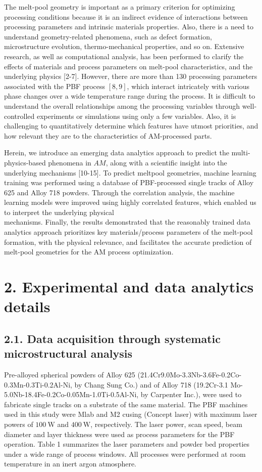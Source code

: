 \documentclass[10pt]{article}
\begin{document}
The melt-pool geometry is important as a primary criterion for optimizing processing conditions because it is an indirect evidence of interactions between processing parameters and intrinsic materials properties. Also, there is a need to understand geometry-related phenomena, such as defect formation, microstructure evolution, thermo-mechanical properties, and so on. Extensive research, as well as computational analysis, has been performed to clarify the effects of materials and process parameters on melt-pool characteristics, and the underlying physics [2-7]. However, there are more than 130 processing parameters associated with the PBF process $[8,9]$, which interact intricately with various phase changes over a wide temperature range during the process. It is difficult to understand the overall relationships among the processing variables through well-controlled experiments or simulations using only a few variables. Also, it is challenging to quantitatively determine which features have utmost priorities, and how relevant they are to the characteristics of AM-processed parts.

Herein, we introduce an emerging data analytics approach to predict the multi-physics-based phenomena in $A M$, along with a scientific insight into the underlying mechanisms [10-15]. To predict meltpool geometries, machine learning training was performed using a database of PBF-processed single tracks of Alloy 625 and Alloy 718 powders. Through the correlation analysis, the machine learning models were improved using highly correlated features, which enabled us to interpret the underlying physical\\
mechanisms. Finally, the results demonstrated that the reasonably trained data analytics approach prioritizes key materials/process parameters of the melt-pool formation, with the physical relevance, and facilitates the accurate prediction of melt-pool geometries for the AM process optimization.

\section*{2. Experimental and data analytics details}
\subsection*{2.1. Data acquisition through systematic microstructural analysis}
Pre-alloyed spherical powders of Alloy 625 (21.4Cr9.0Mo-3.3Nb-3.6Fe-0.2Co-0.3Mn-0.3Ti-0.2Al-Ni, by Chang Sung Co.) and of Alloy 718 (19.2Cr-3.1 Mo-5.0Nb-18.4Fe-0.2Co-0.05Mn-1.0Ti-0.5Al-Ni, by Carpenter Inc.), were used to fabricate single tracks on a substrate of the same material. The PBF machines used in this study were Mlab and M2 cusing (Concept laser) with maximum laser powers of $100 \mathrm{~W}$ and $400 \mathrm{~W}$, respectively. The laser power, scan speed, beam diameter and layer thickness were used as process parameters for the PBF operation. Table 1 summarizes the laser parameters and powder bed properties under a wide range of process windows. All processes were performed at room temperature in an inert argon atmosphere.
\end{document}
